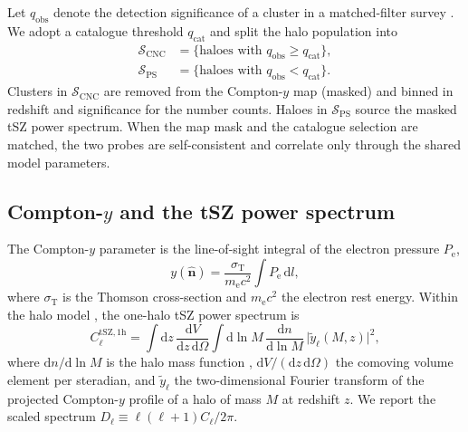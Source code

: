 \documentclass[aps,prd,twocolumn,superscriptaddress,nofootinbib,floatfix]{revtex4-2}
\newcommand{\dd}{\mathrm{d}}
\begin{document}
Let $q_{\mathrm{obs}}$ denote the detection significance of a cluster in a matched-filter survey \citep{Melin:2005yz}.
We adopt a catalogue threshold $q_{\mathrm{cat}}$ and split the halo population into
\begin{align}
    \mathcal{S}_{\mathrm{CNC}} &= \{ \text{haloes with } q_{\mathrm{obs}} \ge q_{\mathrm{cat}} \}, \\
    \mathcal{S}_{\mathrm{PS}}  &= \{ \text{haloes with } q_{\mathrm{obs}} < q_{\mathrm{cat}} \}.
\end{align}
Clusters in $\mathcal{S}_{\mathrm{CNC}}$ are removed from the Compton-$y$ map (masked) and binned in redshift and significance for the number counts.
Haloes in $\mathcal{S}_{\mathrm{PS}}$ source the masked tSZ power spectrum.
When the map mask and the catalogue selection are matched, the two probes are self-consistent and correlate only through the shared model parameters.

\subsection{Compton-$y$ and the tSZ power spectrum}
\label{sec:tsz_ps}

The Compton-$y$ parameter is the line-of-sight integral of the electron pressure $P_{\mathrm{e}}$,
\begin{equation}
    y(\bm{\hat n}) = \frac{\sigma_{\mathrm{T}}}{m_{\mathrm{e}} c^2}
    \int P_{\mathrm{e}}\, \dd l,
    \label{eq:compton_y}
\end{equation}
where $\sigma_{\mathrm{T}}$ is the Thomson cross-section and $m_{\mathrm{e}} c^2$ the electron rest energy.
Within the halo model \citep{Cooray:2002dia}, the one-halo tSZ power spectrum is
\begin{equation}
    C_\ell^{\mathrm{tSZ,1h}}
    = \int \dd z \,\frac{\dd V}{\dd z \,\dd \Omega}
    \int \dd \ln M \,\frac{\dd n}{\dd \ln M}
    \,\bigl|\tilde y_\ell(M,z)\bigr|^2,
    \label{eq:one_halo}
\end{equation}
where $\dd n / \dd \ln M$ is the halo mass function \citep{Tinker:2008ff}, $\dd V / (\dd z \, \dd \Omega)$ the comoving volume element per steradian, and $\tilde y_\ell$ the two-dimensional Fourier transform of the projected Compton-$y$ profile of a halo of mass $M$ at redshift $z$.
We report the scaled spectrum $D_\ell \equiv \ell(\ell+1) C_\ell / 2\pi$.
\end{document}
